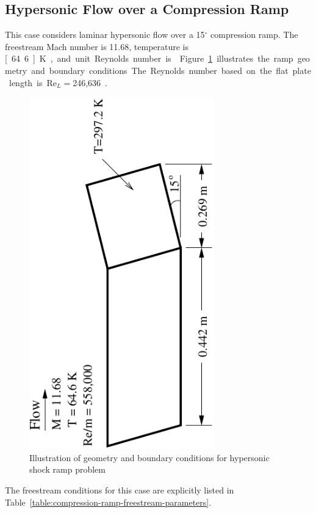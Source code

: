 \subsection{Hypersonic Flow over a Compression Ramp\label{sec:comp_ns_ramp}}
This case considers laminar hypersonic flow over a 15$^\circ$ compression ramp.  The freestream Mach number is 11.68, temperature is \unit[64.6]{K}, and unit Reynolds number is . Figure~\ref{fig:holden_shock_ramp_schematic} illustrates the ramp geometry and boundary conditions.  The Reynolds number based on the flat plate length is Re$_L=$246,636~\cite{holden_laminar_interaction,holden_interaction_review,hypersonic_benchmarks}.
\begin{figure}[hbtp]
  \begin{center}
    \includegraphics[height=6in,angle=270]{figures/holden_ramp/ramp}
    \caption{Illustration of geometry and boundary conditions for hypersonic shock ramp problem}
    \label{fig:holden_shock_ramp_schematic}
    \end{center}
\end{figure}
The freestream conditions for this case are explicitly listed in Table~\ref{table:compression-ramp-freestream-parameters}.
